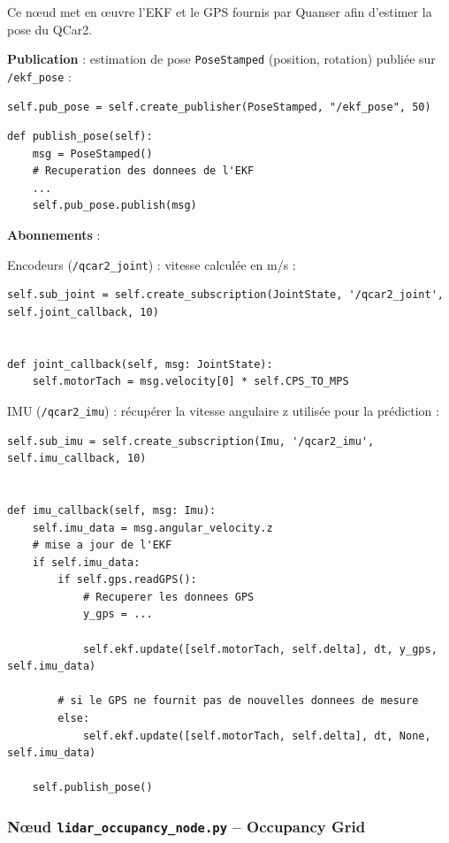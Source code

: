 \documentclass{name}
\begin{document}
Ce nœud met en œuvre l'EKF et le GPS fournis par Quanser afin d'estimer la pose du QCar2.

\textbf{Publication} : estimation de pose \texttt{PoseStamped} (position, rotation) publiée sur \texttt{/ekf\_pose} :

\begin{lstlisting}[style=pythonstyle]
self.pub_pose = self.create_publisher(PoseStamped, "/ekf_pose", 50)
\end{lstlisting}

\begin{lstlisting}[style=pythonstyle]
def publish_pose(self):
    msg = PoseStamped()
    # Recuperation des donnees de l'EKF
    ...
    self.pub_pose.publish(msg)
\end{lstlisting}

\textbf{Abonnements} :

Encodeurs (\texttt{/qcar2\_joint}) : vitesse calculée en m/s :

\begin{lstlisting}[style=pythonstyle]
self.sub_joint = self.create_subscription(JointState, '/qcar2_joint', self.joint_callback, 10)


def joint_callback(self, msg: JointState):
    self.motorTach = msg.velocity[0] * self.CPS_TO_MPS
\end{lstlisting}

IMU (\texttt{/qcar2\_imu}) : récupérer la vitesse angulaire z utilisée pour la prédiction :

\begin{lstlisting}[style=pythonstyle]
self.sub_imu = self.create_subscription(Imu, '/qcar2_imu', self.imu_callback, 10)


def imu_callback(self, msg: Imu):
    self.imu_data = msg.angular_velocity.z
    # mise a jour de l'EKF
    if self.imu_data:
        if self.gps.readGPS():
            # Recuperer les donnees GPS
            y_gps = ...
            
            self.ekf.update([self.motorTach, self.delta], dt, y_gps, self.imu_data)

        # si le GPS ne fournit pas de nouvelles donnees de mesure
        else:
            self.ekf.update([self.motorTach, self.delta], dt, None, self.imu_data)

    self.publish_pose()
\end{lstlisting}

\subsubsection{Nœud \texttt{lidar\_occupancy\_node.py} – Occupancy Grid}
\end{document}

